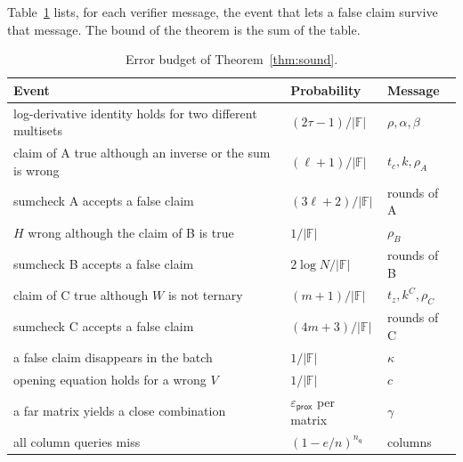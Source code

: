 \documentclass[sigconf,anonymous]{acmart}
\newcommand{\F}{\mathbb{F}}
\newcommand{\epsprox}{\varepsilon_{\mathsf{prox}}}
\newcommand{\nq}{n_{\mathsf{q}}}
\begin{document}
Table~\ref{tab:budget} lists, for each verifier message, the event that lets a false claim survive
that message. The bound of the theorem is the sum of the table.

\begin{table}[t]
\caption{Error budget of Theorem~\ref{thm:sound}.}
\label{tab:budget}
\small
\begin{tabular}{@{}p{}ll@{}}
\toprule
Event & Probability & Message\\
\midrule
log-derivative identity holds for two different multisets & $(2\tau-1)/|\F|$ & $\rho,\alpha,\beta$\\
claim of A true although an inverse or the sum is wrong & $(\ell+1)/|\F|$ & $t_c,k,\rho_A$\\
sumcheck A accepts a false claim & $(3\ell+2)/|\F|$ & rounds of A\\
$H$ wrong although the claim of B is true & $1/|\F|$ & $\rho_B$\\
sumcheck B accepts a false claim & $2\log N/|\F|$ & rounds of B\\
claim of C true although $W$ is not ternary & $(m+1)/|\F|$ & $t_z,k^C,\rho_C$\\
sumcheck C accepts a false claim & $(4m+3)/|\F|$ & rounds of C\\
a false claim disappears in the batch & $1/|\F|$ & $\kappa$\\
opening equation holds for a wrong $V$ & $1/|\F|$ & $c$\\
a far matrix yields a close combination & $\epsprox$ per matrix & $\gamma$\\
all column queries miss & $(1-e/n)^{\nq}$ & columns\\
\bottomrule
\end{tabular}
\end{table}
\end{document}
